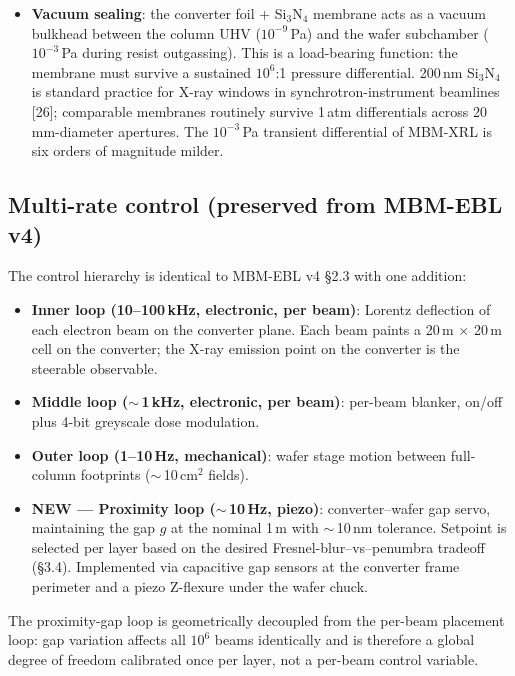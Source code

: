 \documentclass[11pt,letterpaper]{article}
\begin{document}
\begin{itemize}[leftmargin=1.6em]
  \item \textbf{Vacuum sealing}: the converter foil + Si$_3$N$_4$ membrane acts as a vacuum bulkhead between the column UHV ($10^{-9}$\,Pa) and the wafer subchamber ($10^{-3}$\,Pa during resist outgassing). This is a load-bearing function: the membrane must survive a sustained $10^6$:1 pressure differential. 200\,nm Si$_3$N$_4$ is standard practice for X-ray windows in synchrotron-instrument beamlines [26]; comparable membranes routinely survive 1\,atm differentials across 20\,mm-diameter apertures. The $10^{-3}$\,Pa transient differential of MBM-XRL is six orders of magnitude milder.
\end{itemize}

\subsection{Multi-rate control (preserved from MBM-EBL v4)}

The control hierarchy is identical to MBM-EBL v4 \S 2.3 with one addition:

\begin{itemize}[leftmargin=1.6em]
  \item \textbf{Inner loop (10--100\,kHz, electronic, per beam)}: Lorentz deflection of each electron beam on the converter plane. Each beam paints a 20\,\textmu m $\times$ 20\,\textmu m cell on the converter; the X-ray emission point on the converter is the steerable observable.
  \item \textbf{Middle loop ($\sim$\,1\,kHz, electronic, per beam)}: per-beam blanker, on/off plus 4-bit greyscale dose modulation.
  \item \textbf{Outer loop (1--10\,Hz, mechanical)}: wafer stage motion between full-column footprints ($\sim$\,10\,cm$^2$ fields).
  \item \textbf{NEW --- Proximity loop ($\sim$\,10\,Hz, piezo)}: converter--wafer gap servo, maintaining the gap $g$ at the nominal 1\,\textmu m with $\sim$\,10\,nm tolerance. Setpoint is selected per layer based on the desired Fresnel-blur--vs--penumbra tradeoff (\S 3.4). Implemented via capacitive gap sensors at the converter frame perimeter and a piezo Z-flexure under the wafer chuck.
\end{itemize}

The proximity-gap loop is geometrically decoupled from the per-beam placement loop: gap variation affects all $10^6$ beams identically and is therefore a global degree of freedom calibrated once per layer, not a per-beam control variable.
\end{document}
